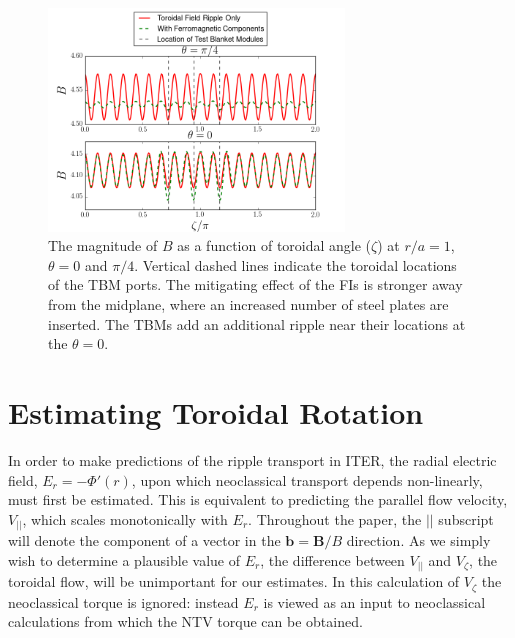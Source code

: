 \documentclass{article}
\begin{document}
\begin{figure}[h!]
\centering
\includegraphics[width=0.7\textwidth]{toroidalripple.png}
\caption{\label{fig:toroidalripple} The magnitude of $B$ as a function of toroidal angle ($\zeta$) at $r/a = 1$, $\theta = 0$ and $\pi/4$. Vertical dashed lines indicate the toroidal locations of the TBM ports. The mitigating effect of the FIs is stronger away from the midplane, where an increased number of steel plates are inserted. The TBMs add an additional ripple near their locations at the $\theta = 0$. }
\end{figure}

\FloatBarrier

\section{Estimating Toroidal Rotation}\label{rotation}

In order to make predictions of the ripple transport in ITER, the radial electric field, $E_r = - \Phi'(r) $, upon which neoclassical transport depends non-linearly, must first be estimated. This is equivalent to predicting the parallel flow velocity, $V_{||}$, which scales monotonically with $E_r$. Throughout the paper, the $||$ subscript will denote the component of a vector in the $\bm{b} = \bm{B}/B$ direction. As we simply wish to determine a plausible value of $E_r$, the difference between $V_{||}$ and $V_{\zeta}$, the toroidal flow, will be unimportant for our estimates. In this calculation of $V_{\zeta}$ the neoclassical torque is ignored: instead $E_r$ is viewed as an input to neoclassical calculations from which the NTV torque can be obtained. 
\end{document}
